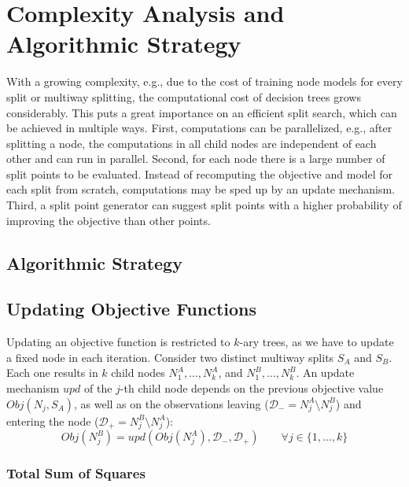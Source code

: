 \documentclass[a4paper, 11pt]{article}
\newcommand{\Data}{\mathcal{D}}
\begin{document}
\section{Complexity Analysis and Algorithmic Strategy}
\label{sec:computational_speedups}

With a growing complexity, e.g., due to the cost of training node models for every split or multiway splitting, the computational cost of decision trees grows considerably. This puts a great importance on an efficient split search, which can be achieved in multiple ways.
First, computations can be parallelized, e.g., after splitting a node, the computations in all child nodes are independent of each other and can run in parallel.
Second, for each node there is a large number of split points to be evaluated. Instead of recomputing the objective and model for each split from scratch, computations may be sped up by an update mechanism. Third, a split point generator can suggest split points with a higher probability of improving the objective than other points.

\subsection{Algorithmic Strategy}




\subsection{Updating Objective Functions}

Updating an objective function is restricted to $k$-ary trees, as we have to update a fixed node in each iteration. Consider two distinct multiway splits $S_A$ and $S_B$. Each one results in $k$ child nodes $N_1^A, \dots, N_k^A$, and $N_1^B, \dots, N_k^B$. An update mechanism $upd$ of the $j$-th child node depends on the previous objective value $Obj(N_j, S_A)$, as well as on the observations leaving ($\Data_{-} = N_j^A \setminus N_j^B$) and entering the node ($\Data_{+} = N_j^B \setminus N_j^A$):
$$
Obj(N_j^B) = upd(Obj(N_j^A), \Data_{-}, \Data_{+}) \qquad \forall j \in \{1, \dots, k\}
$$

\subsubsection{Total Sum of Squares}
\end{document}
